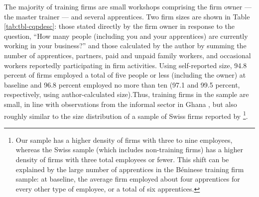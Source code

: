 \documentclass[
  a4paper, twoside, 12pt]{book}
\begin{document}
The majority of training firms are small workshops comprising the firm owner --- the master trainer --- and several apprentices. Two firm sizes are shown in Table \ref{tab:tbl-cqpdesc}: those stated directly by the firm owner in response to the question, ``How many people (including you and your apprentices) are currently working in your business?'' and those calculated by the author by summing the number of apprentices, partners, paid and unpaid family workers, and occasional workers reportedly participating in firm activities. Using self-reported size, 94.8 percent of firms employed a total of five people or less (including the owner) at baseline and 96.8 percent employed no more than ten (97.1 and 99.5 percent, respectively, using author-calculated size).Thus, training firms in the sample are small, in line with observations from the informal sector in Ghana \autocite{frazer2006,velenchik1995}, but also roughly similar to the size distribution of a sample of Swiss firms reported by \textcite{muhlemann2007}\footnote{Our sample has a higher density of firms with three to nine employees, whereas the Swiss sample (which includes non-training firms) has a higher density of firms with three total employees or fewer. This shift can be explained by the large number of apprentices in the Béninese training firm sample: at baseline, the average firm employed about four apprentices for every other type of employee, or a total of six apprentices.}.
\end{document}
